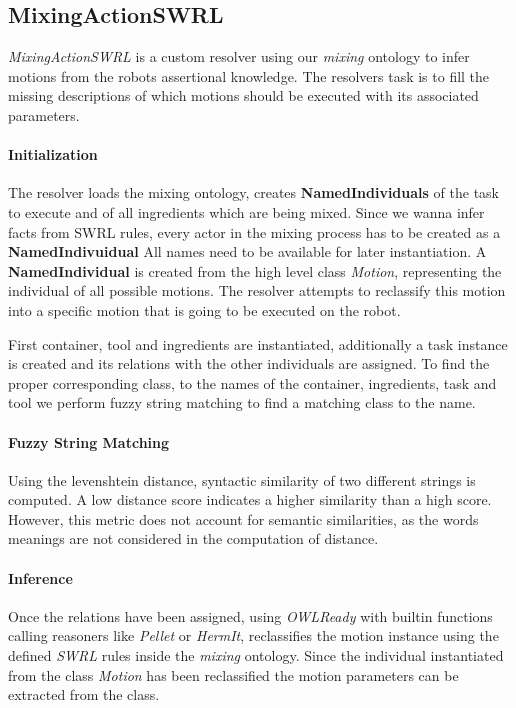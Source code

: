 \subsection{MixingActionSWRL}
\label{subsection:MixingActionSWRL}
\textit{MixingActionSWRL} is a custom resolver using our \textit{mixing} ontology to infer motions from the robots assertional knowledge.
The resolvers task is to fill the missing descriptions of which motions should be executed with its associated parameters.

\paragraph{Initialization}
The resolver loads the mixing ontology, creates \textbf{NamedIndividuals} of the task to execute and of all ingredients which are being mixed.
Since we wanna infer facts from SWRL rules, every actor in the mixing process has to be created as a \textbf{NamedIndivuidual} 
All names need to be available for later instantiation.
A \textbf{NamedIndividual} is created from the high level class \textit{Motion}, representing the individual of all possible motions. 
The resolver attempts to reclassify this motion into a specific motion that is going to be executed on the robot.

First container, tool and ingredients are instantiated, additionally a task instance is created and its relations with 
the other individuals are assigned. To find the proper corresponding class, to the names of the container, ingredients, task and tool
we perform fuzzy string matching to find a matching class to the name. 

\paragraph{Fuzzy String Matching}
Using the levenshtein distance, syntactic similarity of two different strings is computed. A low distance score
indicates a higher similarity than a high score. However, this metric does not account for semantic similarities, 
as the words meanings are not considered in the computation of distance.

\paragraph{Inference}
Once the relations have been assigned, using \textit{OWLReady} with builtin functions calling reasoners like \textit{Pellet} or \textit{HermIt},
reclassifies the motion instance using the defined \textit{SWRL} rules inside the \textit{mixing} ontology.
Since the individual instantiated from the class \textit{Motion} has been reclassified the motion parameters can be extracted from the class.

